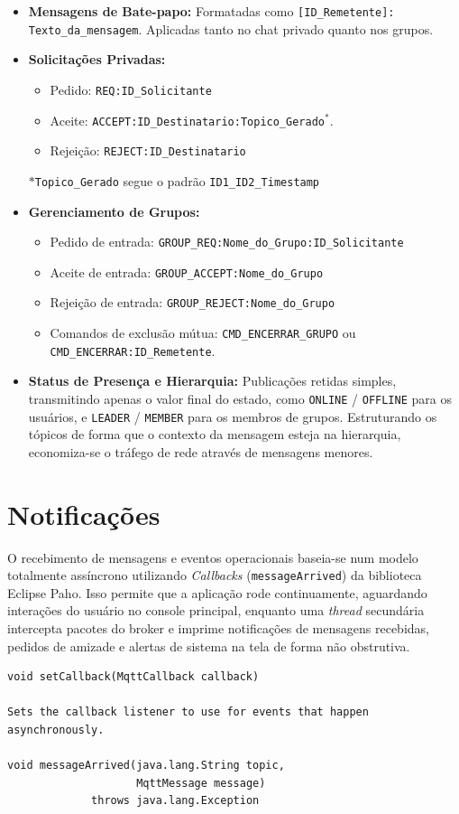 \documentclass{report}
\begin{document}
\begin{itemize}
    \item \textbf{Mensagens de Bate-papo:} Formatadas como \texttt{[ID\_Remetente]: Texto\_da\_mensagem}. Aplicadas tanto no chat privado quanto nos grupos.
    \item \textbf{Solicitações Privadas:} 
    \begin{itemize}
        \item Pedido: \texttt{REQ:ID\_Solicitante}
        \item Aceite: \texttt{ACCEPT:ID\_Destinatario:Topico\_Gerado}$^*$.
        \item Rejeição: \texttt{REJECT:ID\_Destinatario}
    \end{itemize}
    $*$\texttt{Topico\_Gerado} segue o padrão \texttt{ID1\_ID2\_Timestamp}
    \item \textbf{Gerenciamento de Grupos:}
    \begin{itemize}
        \item Pedido de entrada: \texttt{GROUP\_REQ:Nome\_do\_Grupo:ID\_Solicitante}
        \item Aceite de entrada: \texttt{GROUP\_ACCEPT:Nome\_do\_Grupo}
        \item Rejeição de entrada: \texttt{GROUP\_REJECT:Nome\_do\_Grupo}
        \item Comandos de exclusão mútua: \texttt{CMD\_ENCERRAR\_GRUPO} ou \texttt{CMD\_ENCERRAR:ID\_Remetente}.
    \end{itemize}
    \item \textbf{Status de Presença e Hierarquia:} Publicações retidas simples, transmitindo apenas o valor final do estado, como \texttt{ONLINE} / \texttt{OFFLINE} para os usuários, e \texttt{LEADER} / \texttt{MEMBER} para os membros de grupos. Estruturando os tópicos de forma que o contexto da mensagem esteja na hierarquia, economiza-se o tráfego de rede através de mensagens menores.
\end{itemize}

\section{Notificações}
O recebimento de mensagens e eventos operacionais baseia-se num modelo totalmente assíncrono utilizando \textit{Callbacks} (\texttt{messageArrived}) da biblioteca Eclipse Paho. Isso permite que a aplicação rode continuamente, aguardando interações do usuário no console principal, enquanto uma \textit{thread} secundária intercepta pacotes do broker e imprime notificações de mensagens recebidas, pedidos de amizade e alertas de sistema na tela de forma não obstrutiva.
\begin{verbatim}
void setCallback(MqttCallback callback)

Sets the callback listener to use for events that happen asynchronously.

void messageArrived(java.lang.String topic,
                    MqttMessage message)
             throws java.lang.Exception
\end{verbatim}
\end{document}
